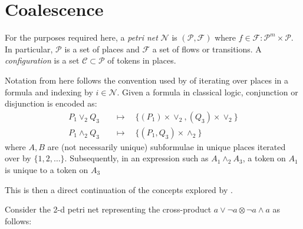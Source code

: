 \chapter{Coalescence}
    
    \begin{definition*}
        For the purposes required here, a \textit{petri net} $\mathcal{N}$ is $(\mathcal{P, F})$ where $f \in \mathcal{F} : \mathcal{P}^m \times \mathcal{P}$.
        In particular, $\mathcal{P}$ is a set of places and $\mathcal{F}$ a set of flows or transitions.
        A \textit{configuration} is a set $\mathcal{C} \subset \mathcal{P}$ of tokens in places.

        Notation from here follows the convention used by \citet{naming-proofs-in-cl} of iterating over places in a formula and indexing by $i \in \mathcal{N}$.
        Given a formula in classical logic, conjunction or disjunction is encoded as:
        \begin{align*}
            P_1 \vee_2 Q_3    &\quad\mapsto\quad \{ (P_1) \times \vee_2, (Q_3) \times \vee_2 \} \\
            P_1 \wedge_2 Q_3 &\quad\mapsto\quad \{ (P_1, Q_3) \times \wedge_2 \}
        \end{align*}
        where $A, B$ are (not necessarily unique) subformulae in unique places iterated over by $\{1, 2, \ldots\}$.
        Subsequently, in an expression such as $A_1 \wedge_2 A_3$, a token on $A_1$ is unique to a token on $A_3$

        This is then a direct continuation of the concepts explored by \citet{petri-nets}.
    \end{definition*}

    \begin{example*}
        Consider the 2-d petri net representing the cross-product $a \vee \neg a \otimes \neg a \wedge a$ as follows:
        
    \end{example*}


